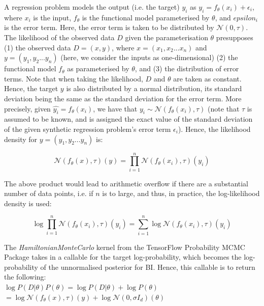 \documentclass[conference]{IEEEtran}
\begin{document}
A regression problem models the output (i.e. the target) $y_i$ as $y_i = f_\theta(x_i) + \epsilon_i$, where $x_i$ is the input, $f_\theta$ is the functional model parameterised by $\theta$, and $epsilon_i$ is the error term. Here, the error term is taken to be distributed by $\mathcal{N}(0, \tau)$. The likelihood of the observed data $D$ given the parameterisation $\theta$ presupposes (1) the observed data $D = (x, y)$, where $x = (x_1, x_2 ... x_n)$ and $y = (y_1, y_2... y_n)$ (here, we consider the inputs as one-dimensional) (2) the functional model $f_\theta$ as parameterised by $\theta$, and (3) the distribution of error terms. Note that when taking the likelihood, $D$ and $\theta$ are taken as constant. Hence, the target $y$ is also distributed by a normal distribution, its standard deviation being the same as the standard deviation for the error term. More precisely, given $\hat{y_i} = f_\theta(x_i)$, we have that $y_i \sim \mathcal{N}(f_\theta(x_i), \tau)$ (note that $\tau$ is assumed to be known, and is assigned the exact value of the standard deviation of the given synthetic regression problem's error term $\epsilon_i$). Hence, the likelihood density for $y = (y_1, y_2... y_n)$ is:

\begin{equation*}
	\mathcal{N}(f_\theta(x), \tau)(y) = \prod_{i=1}^n \mathcal{N}(f_\theta(x_i), \tau)(y_i)
\end{equation*}

The above product would lead to arithmetic overflow if there are a substantial number of data points, i.e. if $n$ is to large, and thus, in practice, the log-likelihood density is used:

\begin{equation*}
	\log \prod_{i=1}^n \mathcal{N}(f_\theta(x_i), \tau)(y_i) = \sum_{i=1}^n \log \mathcal{N}(f_\theta(x_i), \tau)(y_i)
\end{equation*}

The \textit{HamiltonianMonteCarlo} kernel from the TensorFlow Probability MCMC Package takes in a callable for the target log-probability, which becomes the log-probability of the unnormalised posterior for BI. Hence, this callable is to return the following:\\

$\log P(D|\theta)P(\theta) = \log P(D|\theta) + \log P(\theta)$\\

$= \log \mathcal{N}(f_\theta(x), \tau)(y) + \log \mathcal{N}(0, \sigma I_d)(\theta)$\\
\end{document}
